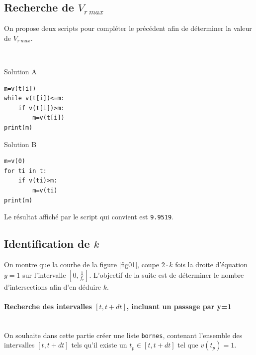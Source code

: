\subsection{Recherche de $V_{r\ max}$}

On propose deux scripts pour compléter le précédent afin de déterminer la valeur de $V_{r\ max}$.

~\

\begin{minipage}{0.45\linewidth}
\begin{center}
Solution A
\begin{verbatim}
m=v(t[i])
while v(t[i])<=m:
    if v(t[i])>m:
        m=v(t[i])
print(m)
\end{verbatim}
\end{center}
\end{minipage}\hfill
\begin{minipage}{0.45\linewidth}
\begin{center}
Solution B
\begin{verbatim}
m=v(0)
for ti in t:
    if v(ti)>m:
        m=v(ti)        
print(m)
\end{verbatim}
\end{center}
\end{minipage}


Le résultat affiché par le script qui convient est \verb?9.9519?.


\subsection{Identification de $k$}

On montre que la courbe de la figure \ref{fig01}, coupe $2\cdot k$ fois la droite d'équation $y=1$ sur l'intervalle $\left[0,\frac{1}{f_r}\right]$. L'objectif de la suite est de déterminer le nombre d'intersections afin d'en déduire $k$.

\paragraph{Recherche des intervalles $[t,t+dt]$, incluant un passage par y=1} ~\ \\

On souhaite dans cette partie créer une liste \verb?bornes?, contenant l'ensemble des intervalles $[t,t+dt]$ tels qu'il existe un $t_p\in[t,t+dt]$ tel que $v(t_p)=1$.

